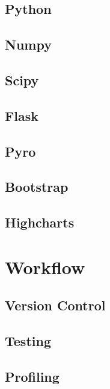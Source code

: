 \documentclass[a4paper, openany, oneside]{memoir}
\begin{document}
\subsection{Python}
\label{sec:python}

\subsection{Numpy}
\label{sec:numpy}

\subsection{Scipy}
\label{sec:scipy}

\subsection{Flask}
\label{sec:flask}

\subsection{Pyro}
\label{sec:pyro}

\subsection{Bootstrap}
\label{sec:bootstrap}

\subsection{Highcharts}
\label{sec:highcharts}

\section{Workflow}
\label{sec:workflow}

\subsection{Version Control}
\label{sec:version-control}

\subsection{Testing}
\label{sec:testing}

\subsection{Profiling}
\label{sec:profiling}
\end{document}
